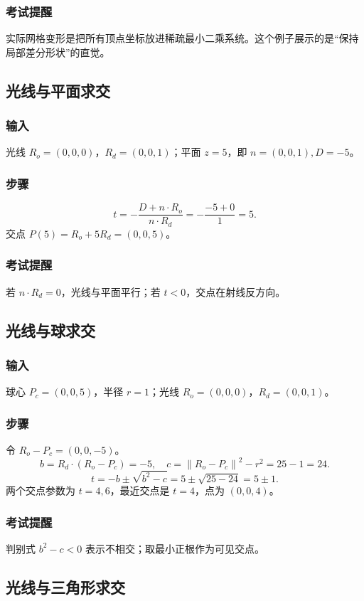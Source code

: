 \documentclass[UTF8,fontset=fandol,11pt]{ctexart}
\newcommand{\norm}[1]{\left\lVert #1 \right\rVert}
\begin{document}
\subsubsection*{考试提醒}
实际网格变形是把所有顶点坐标放进稀疏最小二乘系统。这个例子展示的是“保持局部差分形状”的直觉。

\subsection{光线与平面求交}
\subsubsection*{输入}
光线 $R_o=(0,0,0)$，$R_d=(0,0,1)$；平面 $z=5$，即 $n=(0,0,1),D=-5$。
\subsubsection*{步骤}
\[
t=-\frac{D+n\cdot R_o}{n\cdot R_d}
  =-\frac{-5+0}{1}=5.
\]
交点 $P(5)=R_o+5R_d=(0,0,5)$。
\subsubsection*{考试提醒}
若 $n\cdot R_d=0$，光线与平面平行；若 $t<0$，交点在射线反方向。

\subsection{光线与球求交}
\subsubsection*{输入}
球心 $P_c=(0,0,5)$，半径 $r=1$；光线 $R_o=(0,0,0)$，$R_d=(0,0,1)$。
\subsubsection*{步骤}
令 $R_o-P_c=(0,0,-5)$。
\[
b=R_d\cdot(R_o-P_c)=-5,\quad
c=\norm{R_o-P_c}^2-r^2=25-1=24.
\]
\[
t=-b\pm\sqrt{b^2-c}=5\pm\sqrt{25-24}=5\pm1.
\]
两个交点参数为 $t=4,6$，最近交点是 $t=4$，点为 $(0,0,4)$。
\subsubsection*{考试提醒}
判别式 $b^2-c<0$ 表示不相交；取最小正根作为可见交点。

\subsection{光线与三角形求交}
\end{document}
